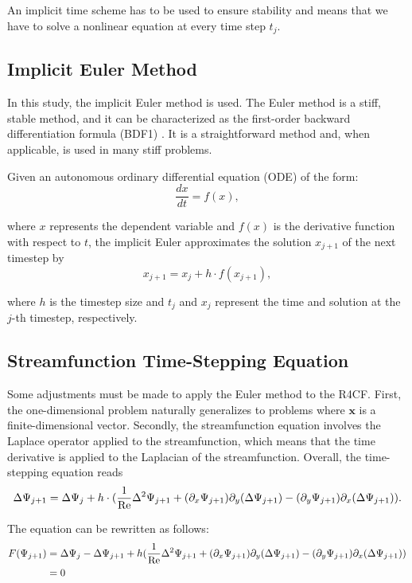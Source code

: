 An implicit time scheme has to be used to ensure stability and means that we
have to solve a nonlinear equation at every time step $t_j$. 

\subsection{Implicit Euler Method}

In this study, the implicit Euler method is used. The Euler method is a stiff,
stable method, and it can be characterized as the first-order backward
differentiation formula (BDF1) \citep{meseguer2020}. It is a straightforward
method and, when applicable, is used in many stiff problems.

Given an autonomous ordinary differential equation (ODE) of the form:
\begin{equation}
  \frac{{dx}}{{dt}} = f(x),
\end{equation}

where $x$ represents the dependent variable and
$f(x)$ is the derivative function with respect to $t$, the implicit Euler
approximates the solution $x_{j+1}$ of the next timestep by
\begin{equation}
  x_{j+1} = x_j + h \cdot f(x_{j+1}),
\end{equation}

where $h$ is the timestep size and $t_j$ and $x_j$ represent the time and
solution at the $j$-th timestep, respectively.

\subsection{Streamfunction Time-Stepping Equation}

Some adjustments must be made to apply the Euler method to the R4CF. First, the
one-dimensional problem naturally generalizes to problems where $\mathbf{x}$ is
a finite-dimensional vector. Secondly, the streamfunction equation involves the
Laplace operator applied to the streamfunction, which means that the time
derivative is applied to the Laplacian of the streamfunction. Overall, the time-stepping
equation reads
\begin{align}
  \Delta\Psi_{j+1} = \Delta\Psi_j + h \cdot (\frac{1}{\mathrm{Re}}\Delta^2 \Psi_{j+1} +
  (\partial_x \Psi_{j+1}) \partial_y(\Delta \Psi_{j+1}) -
  (\partial_y \Psi_{j+1}) \partial_x(\Delta \Psi_{j+1})). \label{eq:str_timestepping}
\end{align}

The equation can be rewritten as follows:
\begin{align}
  F(\Psi_{j+1}) & = \Delta\Psi_j - \Delta\Psi_{j+1} + h (\frac{1}{\mathrm{Re}}\Delta^2 \Psi_{j+1} +
  (\partial_x \Psi_{j+1}) \partial_y(\Delta \Psi_{j+1}) -
  (\partial_y \Psi_{j+1}) \partial_x(\Delta \Psi_{j+1})) \nonumber \\
  & =  0 \label{eq:newton_ts}
\end{align}

